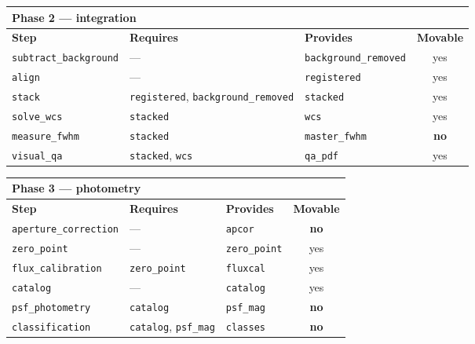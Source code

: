 \documentclass[11pt,a4paper]{article}
\begin{document}
\begin{center}
\begin{tabularx}{\textwidth}{|l|X|X|c|}
\hline
\multicolumn{4}{|l|}{\textbf{Phase 2 --- integration}} \\
\hline
\textbf{Step} & \textbf{Requires} & \textbf{Provides} & \textbf{Movable} \\
\hline
\texttt{subtract\_background} & --- & \texttt{background\_removed} & yes \\
\hline
\texttt{align} & --- & \texttt{registered} & yes \\
\hline
\texttt{stack} & \texttt{registered}, \texttt{background\_removed} & \texttt{stacked} & yes \\
\hline
\texttt{solve\_wcs} & \texttt{stacked} & \texttt{wcs} & yes \\
\hline
\texttt{measure\_fwhm} & \texttt{stacked} & \texttt{master\_fwhm} & \textbf{no} \\
\hline
\texttt{visual\_qa} & \texttt{stacked}, \texttt{wcs} & \texttt{qa\_pdf} & yes \\
\hline
\end{tabularx}
\end{center}

\begin{center}
\begin{tabularx}{\textwidth}{|l|X|X|c|}
\hline
\multicolumn{4}{|l|}{\textbf{Phase 3 --- photometry}} \\
\hline
\textbf{Step} & \textbf{Requires} & \textbf{Provides} & \textbf{Movable} \\
\hline
\texttt{aperture\_correction} & --- & \texttt{apcor} & \textbf{no} \\
\hline
\texttt{zero\_point} & --- & \texttt{zero\_point} & yes \\
\hline
\texttt{flux\_calibration} & \texttt{zero\_point} & \texttt{fluxcal} & yes \\
\hline
\texttt{catalog} & --- & \texttt{catalog} & yes \\
\hline
\texttt{psf\_photometry} & \texttt{catalog} & \texttt{psf\_mag} & \textbf{no} \\
\hline
\texttt{classification} & \texttt{catalog}, \texttt{psf\_mag} & \texttt{classes} & \textbf{no} \\
\hline
\end{tabularx}
\end{center}
\end{document}
